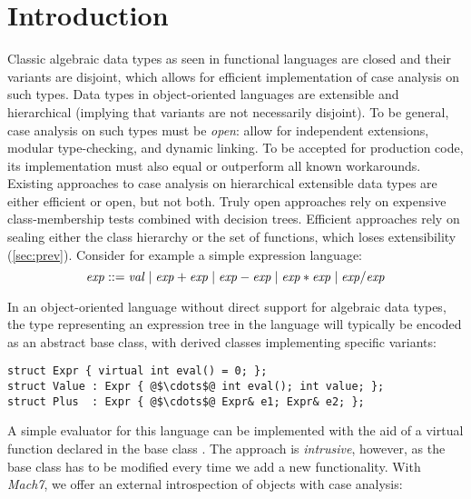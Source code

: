 \section{Introduction} %
\label{sec:intro}


Classic algebraic data types as seen in functional languages are closed and their 
variants are disjoint, which allows for efficient implementation of case analysis 
on such types. Data types in object-oriented languages are extensible
and hierarchical (implying that variants are not necessarily 
disjoint). 
To be general, case analysis on such types must be \emph{open}: allow for 
independent extensions, modular type-checking, and dynamic linking. To be 
accepted for production code, its implementation must also equal or outperform 
all known workarounds. Existing approaches to case analysis on hierarchical 
extensible data types are either efficient or open, but not both.
Truly open approaches rely on expensive class-membership tests combined with 
decision trees. Efficient approaches rely on sealing either the class 
hierarchy or the set of functions, which loses extensibility (\textsection\ref{sec:prev}). %
Consider for example a simple expression language: 
\begin{displaymath}
\mathit{exp} ::={} \mathit{val} 
  \mid{} \mathit{exp} + \mathit{exp}
  \mid{} \mathit{exp} - \mathit{exp}
  \mid{} \mathit{exp} * \mathit{exp}
  \mid{} \mathit{exp} / \mathit{exp}
\end{displaymath}

\noindent 
In an object-oriented language without direct support for algebraic data types, 
the type representing an expression tree in the language will typically be 
encoded as an abstract base class, %
with derived classes implementing specific variants:
%
\begin{lstlisting}[keepspaces,columns=flexible]
struct Expr { virtual int eval() = 0; };
struct Value : Expr { @$\cdots$@ int eval(); int value; };
struct Plus  : Expr { @$\cdots$@ Expr& e1; Expr& e2; };
\end{lstlisting}

\noindent
A simple evaluator for this language can be implemented with the aid of a
virtual function  declared in the base class . 
The approach is \emph{intrusive}, however, as the base class has to be
modified every time we add a new functionality. 
With \emph{Mach7}, we offer an external introspection of objects with case analysis:

